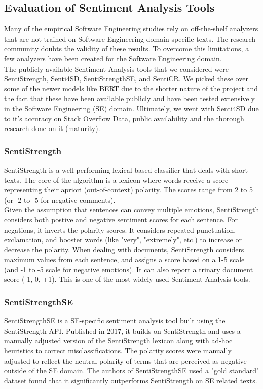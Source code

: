 \documentclass[conference]{IEEEtran}
\begin{document}
\subsection{Evaluation of Sentiment Analysis Tools}
Many of the empirical Software Engineering studies rely on off-the-shelf analyzers that are not trained on Software Engineering domain-specific texts. The research community doubts the validity of these results\cite{b21}. To overcome this limitations, a few analyzers have been created for the Software Engineering domain.\\ 

The publicly available Sentiment Analysis tools that we considered were SentiStrength, Senti4SD, SentiStrengthSE, and SentiCR\cite{b16, b18, b19, b20}. We picked these over some of the newer models like BERT\cite{b22} due to the shorter nature of the project and the fact that these have been available publicly and have been tested extensively in the Software Engineering (SE) domain. Ultimately, we went with Senti4SD due to it's accuracy on Stack Overflow Data, public availability and the thorough research done on it (maturity).\\

\subsubsection{SentiStrength}
SentiStrength is a well performing lexical-based classifier that deals with short texts. The core of the algorithm is a lexicon where words receive a score representing their apriori (out-of-context) polarity. The scores range from 2 to 5 (or -2 to -5 for negative comments). \\

Given the assumption that sentences can convey multiple emotions, SentiStrength considers both postive and negative sentiment scores for each sentence. For negations, it inverts the polarity scores. It considers repeated punctuation, exclamation, and booster words (like "very", "extremely", etc.) to increase or decrease the polarity. When dealing with documents, SentiStrength considers maximum values from each sentence, and assigns a score based on a 1-5 scale (and -1 to -5 scale for negative emotions). It can also report a trinary document score (-1, 0, +1). This is one of the most widely used Sentiment Analysis tools.\cite{b16, b21}\\

\subsubsection{SentiStrengthSE}
SentiStrengthSE is a SE-specific sentiment analysis tool built using the SentiStrength API\cite{b20}. Published in 2017, it builds on SentiStrength and uses a manually adjusted version of the SentiStrength lexicon along with ad-hoc heuristics to correct misclassifications. The polarity scores were manually adjusted to reflect the neutral polarity of terms that are perceived as negative outside of the SE domain. The authors of SentiStrengthSE used a "gold standard" dataset\cite{b23} found that it significantly outperforms SentiStrength on SE related texts\cite{b20}.\\
\end{document}
